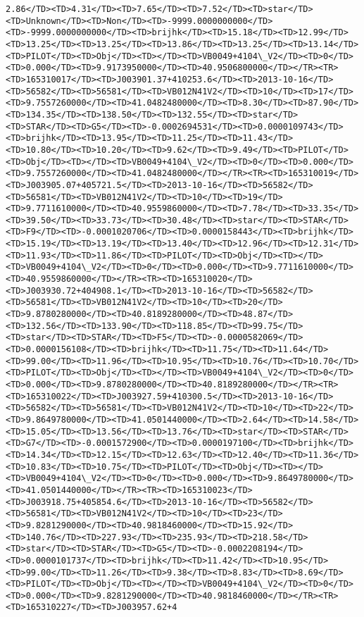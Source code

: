 \documentclass[11pt]{article}
\begin{document}
\begin{Verbatim}[commandchars=\\\{\}]
2.86</TD><TD>4.31</TD><TD>7.65</TD><TD>7.52</TD><TD>star</TD><TD>Unknown</TD><TD>Non</TD><TD>-9999.0000000000</TD><TD>-9999.0000000000</TD><TD>brijhk</TD><TD>15.18</TD><TD>12.99</TD><TD>13.25</TD><TD>13.25</TD><TD>13.86</TD><TD>13.25</TD><TD>13.14</TD><TD>PILOT</TD><TD>Obj</TD><TD></TD><TD>VB0049+4104\_V2</TD><TD>0</TD><TD>0.000</TD><TD>9.9173950000</TD><TD>40.9506800000</TD></TR><TR><TD>165310017</TD><TD>J003901.37+410253.6</TD><TD>2013-10-16</TD><TD>56582</TD><TD>56581</TD><TD>VB012N41V2</TD><TD>10</TD><TD>17</TD><TD>9.7557260000</TD><TD>41.0482480000</TD><TD>8.30</TD><TD>87.90</TD><TD>134.35</TD><TD>138.50</TD><TD>132.55</TD><TD>star</TD><TD>STAR</TD><TD>G5</TD><TD>-0.0002694531</TD><TD>0.0000109743</TD><TD>brijhk</TD><TD>13.95</TD><TD>11.25</TD><TD>11.43</TD><TD>10.80</TD><TD>10.20</TD><TD>9.62</TD><TD>9.49</TD><TD>PILOT</TD><TD>Obj</TD><TD></TD><TD>VB0049+4104\_V2</TD><TD>0</TD><TD>0.000</TD><TD>9.7557260000</TD><TD>41.0482480000</TD></TR><TR><TD>165310019</TD><TD>J003905.07+405721.5</TD><TD>2013-10-16</TD><TD>56582</TD><TD>56581</TD><TD>VB012N41V2</TD><TD>10</TD><TD>19</TD><TD>9.7711610000</TD><TD>40.9559860000</TD><TD>7.78</TD><TD>33.35</TD><TD>39.50</TD><TD>33.73</TD><TD>30.48</TD><TD>star</TD><TD>STAR</TD><TD>F9</TD><TD>-0.0001020706</TD><TD>0.0000158443</TD><TD>brijhk</TD><TD>15.19</TD><TD>13.19</TD><TD>13.40</TD><TD>12.96</TD><TD>12.31</TD><TD>11.93</TD><TD>11.86</TD><TD>PILOT</TD><TD>Obj</TD><TD></TD><TD>VB0049+4104\_V2</TD><TD>0</TD><TD>0.000</TD><TD>9.7711610000</TD><TD>40.9559860000</TD></TR><TR><TD>165310020</TD><TD>J003930.72+404908.1</TD><TD>2013-10-16</TD><TD>56582</TD><TD>56581</TD><TD>VB012N41V2</TD><TD>10</TD><TD>20</TD><TD>9.8780280000</TD><TD>40.8189280000</TD><TD>48.87</TD><TD>132.56</TD><TD>133.90</TD><TD>118.85</TD><TD>99.75</TD><TD>star</TD><TD>STAR</TD><TD>F5</TD><TD>-0.0000582069</TD><TD>0.0000156108</TD><TD>brijhk</TD><TD>11.75</TD><TD>11.64</TD><TD>99.00</TD><TD>11.96</TD><TD>10.95</TD><TD>10.76</TD><TD>10.70</TD><TD>PILOT</TD><TD>Obj</TD><TD></TD><TD>VB0049+4104\_V2</TD><TD>0</TD><TD>0.000</TD><TD>9.8780280000</TD><TD>40.8189280000</TD></TR><TR><TD>165310022</TD><TD>J003927.59+410300.5</TD><TD>2013-10-16</TD><TD>56582</TD><TD>56581</TD><TD>VB012N41V2</TD><TD>10</TD><TD>22</TD><TD>9.8649780000</TD><TD>41.0501440000</TD><TD>2.64</TD><TD>14.58</TD><TD>15.05</TD><TD>13.56</TD><TD>13.76</TD><TD>star</TD><TD>STAR</TD><TD>G7</TD><TD>-0.0001572900</TD><TD>0.0000197100</TD><TD>brijhk</TD><TD>14.34</TD><TD>12.15</TD><TD>12.63</TD><TD>12.40</TD><TD>11.36</TD><TD>10.83</TD><TD>10.75</TD><TD>PILOT</TD><TD>Obj</TD><TD></TD><TD>VB0049+4104\_V2</TD><TD>0</TD><TD>0.000</TD><TD>9.8649780000</TD><TD>41.0501440000</TD></TR><TR><TD>165310023</TD><TD>J003918.75+405854.6</TD><TD>2013-10-16</TD><TD>56582</TD><TD>56581</TD><TD>VB012N41V2</TD><TD>10</TD><TD>23</TD><TD>9.8281290000</TD><TD>40.9818460000</TD><TD>15.92</TD><TD>140.76</TD><TD>227.93</TD><TD>235.93</TD><TD>218.58</TD><TD>star</TD><TD>STAR</TD><TD>G5</TD><TD>-0.0002208194</TD><TD>0.0000101737</TD><TD>brijhk</TD><TD>11.42</TD><TD>10.95</TD><TD>99.00</TD><TD>11.26</TD><TD>9.38</TD><TD>8.83</TD><TD>8.69</TD><TD>PILOT</TD><TD>Obj</TD><TD></TD><TD>VB0049+4104\_V2</TD><TD>0</TD><TD>0.000</TD><TD>9.8281290000</TD><TD>40.9818460000</TD></TR><TR><TD>165310227</TD><TD>J003957.62+4
\end{Verbatim}
\end{document}
